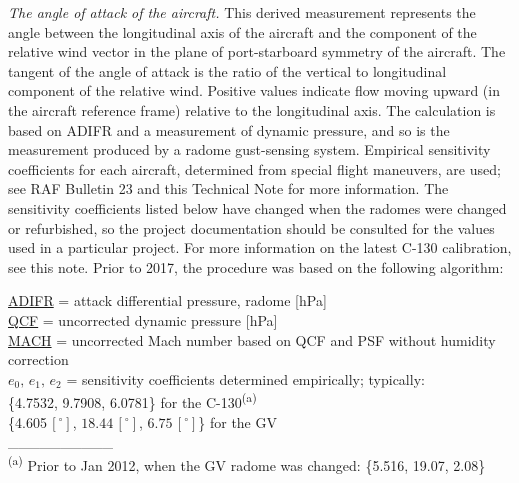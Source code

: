 \documentclass[
  english,
]{book}
\begin{document}
\emph{The angle of attack of the aircraft.} This derived measurement
represents the angle between the longitudinal axis of the aircraft and
the component of the relative wind vector in the plane of port-starboard
symmetry of the aircraft. The tangent of the angle of attack is the
ratio of the vertical to longitudinal component of the relative wind.
Positive values indicate flow moving upward (in the aircraft reference
frame) relative to the longitudinal axis. The calculation is based on
ADIFR and a measurement of dynamic pressure, and so is the measurement
produced by a radome gust-sensing system. Empirical sensitivity
coefficients for each aircraft, determined from special flight
maneuvers, are used; see RAF Bulletin 23 and this Technical Note for
more information. The sensitivity coefficients listed below have changed
when the radomes were changed or refurbished, so the project
documentation should be consulted for the values used in a particular
project. For more information on the latest C-130 calibration, see this
note. Prior to 2017, the procedure was based on the following algorithm:

\protect\hyperlink{adifr}{ADIFR} = attack differential pressure, radome
{[}hPa{]}\\
\protect\hyperlink{qcx}{QCF} = uncorrected dynamic pressure {[}hPa{]}\\
\protect\hyperlink{mach-number}{MACH} = uncorrected Mach number based on
QCF and PSF without humidity correction\\
\(e_{0},\,e{}_{1},\,e_{2}\) = sensitivity coefficients determined
empirically; typically:\\
\hspace*{0.333em}\hspace*{0.333em}\hspace*{0.333em}\hspace*{0.333em}\hspace*{0.333em}\{4.7532,
9.7908, 6.0781\} for the C-130\textsuperscript{(a)}\\
\hspace*{0.333em}\hspace*{0.333em}\hspace*{0.333em}\hspace*{0.333em}\hspace*{0.333em}\{4.605\(\,[^{\circ}]\),
\(18.44\,[^{\circ}]\), \(6.75\,[^{\circ}]\)\} for the GV\\
\_\_\_\_\_\_\_\_\_\_\\
\textsuperscript{(a)} Prior to Jan 2012, when the GV radome was changed:
\{5.516, 19.07, 2.08\}
\end{document}
